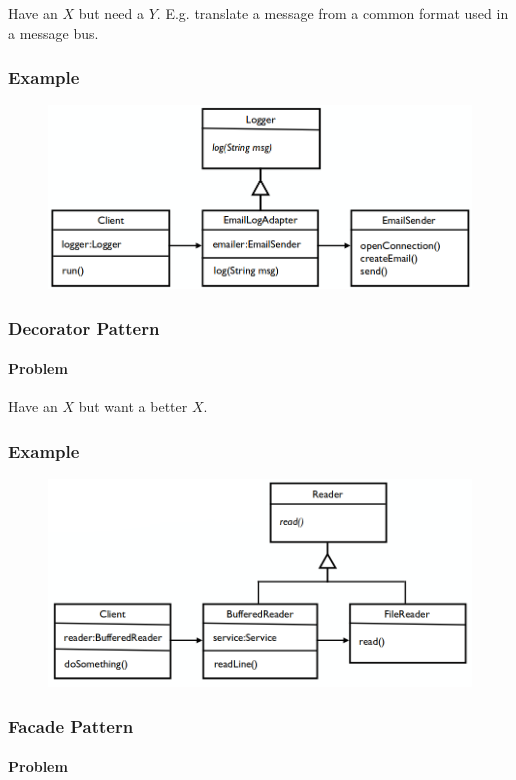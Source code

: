 \documentclass[twocolumn,english]{article}
\begin{document}
Have an $X$ but need a $Y$. E.g. translate a message from a common
format used in a message bus.

\subsubsection*{Example}

\begin{figure}[H]
\centering{}\includegraphics[width=0.6\columnwidth]{img/adapter}
\end{figure}

\subsubsection{Decorator Pattern}

\paragraph{Problem}

Have an $X$ but want a better $X$.

\subsubsection*{Example}

\begin{figure}[H]
\centering{}\includegraphics[width=0.6\columnwidth]{img/decorator}
\end{figure}

\subsubsection{Facade Pattern}

\paragraph{Problem}
\end{document}
